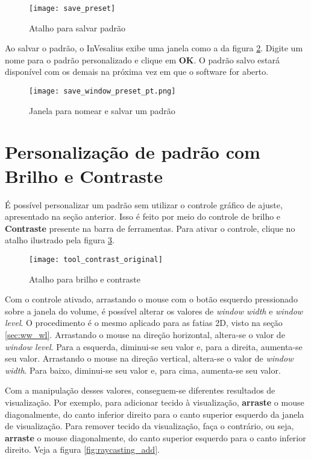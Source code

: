 \begin{figure}[!htb]
\centering
\texttt{[image: save\_preset]}
\caption{Atalho para salvar padrão}
\label{fig:save_preset}
\end{figure}
 
Ao salvar o padrão, o InVesalius exibe uma janela como a da figura \ref{fig:save_window_preset}.
Digite um nome para o padrão personalizado e clique em \textbf{OK}. O padrão salvo estará
disponível com os demais na próxima vez em que o software for aberto.

\begin{figure}[!htb]
\centering
\texttt{[image: save\_window\_preset\_pt.png]}
\caption{Janela para nomear e salvar um padrão}
\label{fig:save_window_preset}
\end{figure}

\section{Personalização de padrão com Brilho e Contraste}

É possível personalizar um padrão sem utilizar o controle gráfico de ajuste, apresentado na seção
anterior. Isso é feito por meio do controle de brilho e \textbf{Contraste} presente na barra de
ferramentas. Para ativar o controle, clique no atalho ilustrado pela figura
\ref{fig:tool_contrast_original_vol}.

\begin{figure}[!htb]
\centering
\texttt{[image: tool\_contrast\_original]}
\caption{Atalho para brilho e contraste}
\label{fig:tool_contrast_original_vol}
\end{figure}

Com o controle ativado, arrastando o mouse com o botão esquerdo pressionado
sobre a janela do volume, é possível alterar os valores de \textit{window width} e
\textit{window level}. O procedimento é o mesmo aplicado para as fatias 2D, visto
na seção \ref{sec:ww_wl}. Arrastando o mouse na direção horizontal, altera-se o valor de
\textit{window level}. Para a esquerda, diminui-se seu valor e, para a direita,
aumenta-se seu valor. Arrastando o mouse na direção vertical, altera-se o valor de
\textit{window width}. Para baixo, diminui-se seu valor e, para cima, aumenta-se seu
valor.

Com a manipulação desses valores, conseguem-se diferentes resultados de
visualização. Por exemplo, para adicionar tecido à visualização, \textbf{arraste} o
mouse diagonalmente, do canto inferior direito para o canto superior esquerdo da janela
de visualização. Para remover tecido da visualização, faça o contrário, ou seja,
\textbf{arraste} o mouse diagonalmente, do canto superior esquerdo para o canto inferior
direito. Veja a figura \ref{fig:raycasting_add}.

